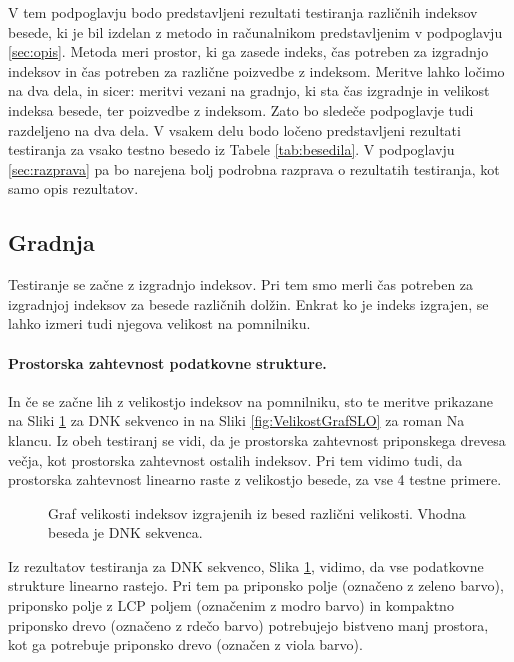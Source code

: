 V tem podpoglavju bodo predstavljeni rezultati testiranja različnih indeksov besede, ki je bil izdelan z metodo in računalnikom predstavljenim v podpoglavju \ref{sec:opis}. Metoda meri prostor, ki ga zasede indeks, čas potreben za izgradnjo indeksov in čas potreben za različne poizvedbe z indeksom. Meritve lahko ločimo na dva dela, in sicer: meritvi vezani na gradnjo, ki sta čas izgradnje in velikost indeksa besede, ter poizvedbe z indeksom. Zato bo sledeče podpoglavje tudi razdeljeno na dva dela. V vsakem delu bodo ločeno predstavljeni rezultati testiranja za vsako testno besedo iz Tabele \ref{tab:besedila}. V podpoglavju \ref{sec:razprava} pa bo narejena bolj podrobna razprava o rezultatih testiranja, kot samo opis rezultatov.

\subsection{Gradnja}
Testiranje se začne z izgradnjo indeksov. Pri tem smo merli čas potreben za izgradnjoj indeksov za besede različnih dolžin. Enkrat ko je indeks izgrajen, se lahko izmeri tudi njegova velikost na pomnilniku.

\paragraph{Prostorska zahtevnost podatkovne strukture.}

In če se začne lih z velikostjo indeksov na pomnilniku, sto te meritve prikazane na Sliki \ref{fig:VelikostGraf} za DNK sekvenco in na Sliki \ref{fig:VelikostGrafSLO} za roman Na klancu. Iz obeh testiranj se vidi, da je prostorska zahtevnost priponskega drevesa večja, kot prostorska zahtevnost ostalih indeksov. Pri tem vidimo tudi, da prostorska zahtevnost linearno raste z velikostjo besede, za vse 4 testne primere.

\begin{figure}[htb]
    \centering
    
    \caption{Graf velikosti indeksov izgrajenih iz besed različni velikosti. Vhodna beseda je DNK sekvenca.} 
    \label{fig:VelikostGraf}
\end{figure}

Iz rezultatov testiranja za DNK sekvenco, Slika \ref{fig:VelikostGraf}, vidimo, da vse podatkovne strukture linearno rastejo. Pri tem pa priponsko polje (označeno z zeleno barvo), priponsko polje z LCP poljem (označenim z modro barvo) in kompaktno priponsko drevo (označeno z rdečo barvo) potrebujejo bistveno manj prostora, kot ga potrebuje priponsko drevo (označen z viola barvo).

